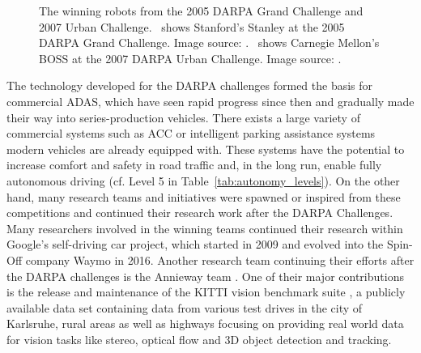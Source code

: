 \begin{figure}[t!]
	\centering
	\caption{The winning robots from the 2005 \ac{DARPA} Grand Challenge and 2007 Urban Challenge.~\protect{} shows Stanford's Stanley at the 2005 \ac{DARPA} Grand Challenge. Image source: \textcite{Thrun2006}.~\protect{} shows Carnegie Mellon's BOSS at the 2007 \ac{DARPA} Urban Challenge. Image source: \textcite{Urmson.2008}.}
    \label{fig:darpa_chal}
\end{figure}

The technology developed for the \ac{DARPA} challenges formed the basis for commercial \ac{ADAS}, which have seen rapid progress since then and gradually made their way into series-production vehicles.
There exists a large variety of commercial systems such as \ac{ACC} or intelligent parking assistance systems modern vehicles are already equipped with.
These systems have the potential to increase comfort and safety in road traffic and, in the long run, enable fully autonomous driving (cf. Level \num{5}  in Table~\ref{tab:autonomy_levels}).
On the other hand, many research teams and initiatives were spawned or inspired from these competitions and continued their research work after the \ac{DARPA} Challenges.
Many researchers involved in the winning teams continued their research within Google's self-driving car project, which started in 2009 and evolved into the Spin-Off company Waymo  in \num{2016}.
Another research team continuing their efforts after the \ac{DARPA} challenges is the Annieway team .
One of their major contributions is the release and maintenance of the KITTI vision benchmark suite \parencite{Geiger2013a}, a publicly available data set containing data from various test drives in the city of Karlsruhe, rural areas as well as highways focusing on providing real world data for vision tasks like stereo, optical flow and 3D object detection and tracking.

